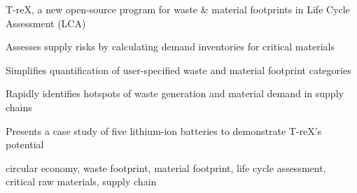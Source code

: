 \documentclass[a4paper,fleqn]{cas-dc}
\begin{document}
	\begin{highlights}
		\item T-reX, a new open-source program for waste \& material footprints in Life Cycle Assessment (LCA)
		\item Assesses supply risks by calculating demand inventories for critical materials
		\item Simplifies quantification of user-specified waste and material footprint categories
		\item Rapidly identifies hotspots of waste generation and material demand in supply	chains
		\item Presents a case study of five lithium-ion batteries to demonstrate T-reX's potential
	\end{highlights}
	
	
	\begin{keywords}
		circular economy, waste footprint, material footprint, life cycle assessment, critical raw materials, supply chain
	\end{keywords}
	
	\maketitle
	
\end{document}
